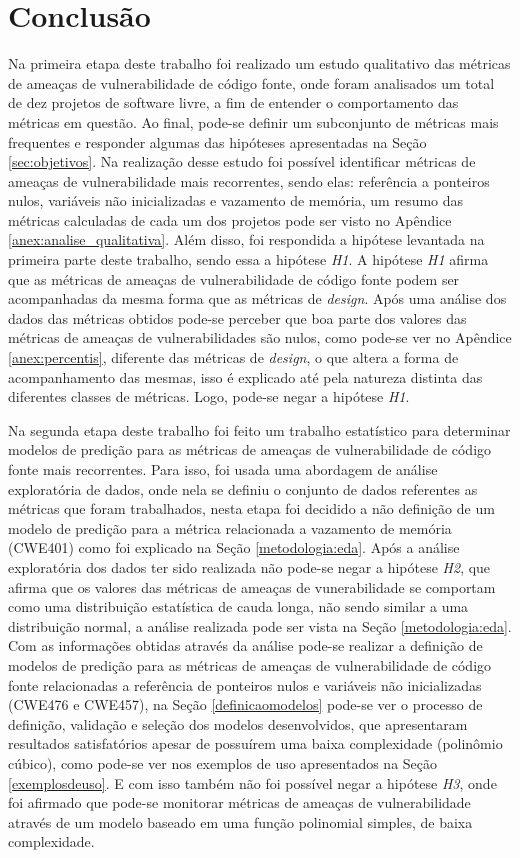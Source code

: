 \chapter{Conclusão} \label{chap:conclusao}

Na primeira etapa deste trabalho foi realizado um estudo qualitativo das
métricas de ameaças de vulnerabilidade de código fonte, onde foram analisados um
total de dez projetos de software livre, a fim de entender o comportamento das
métricas em questão. Ao final, pode-se definir um subconjunto de métricas mais
frequentes e responder algumas das hipóteses apresentadas na Seção
\ref{sec:objetivos}. Na realização desse estudo foi possível identificar
métricas de ameaças de vulnerabilidade mais recorrentes, sendo elas: referência
a ponteiros nulos, variáveis não inicializadas e vazamento de memória, um resumo
das métricas calculadas de cada um dos projetos pode ser visto no Apêndice
\ref{anex:analise_qualitativa}. Além disso, foi respondida a hipótese levantada
na primeira parte deste trabalho, sendo essa a hipótese \textit{H1}. A hipótese
\textit{H1} afirma que as métricas de ameaças de vulnerabilidade de código fonte
podem ser acompanhadas da mesma forma que as métricas de \textit{design}.
Após uma análise dos dados das métricas obtidos pode-se perceber que boa parte
dos valores das métricas de ameaças de vulnerabilidades são nulos, como pode-se
ver no Apêndice \ref{anex:percentis}, diferente das métricas de \textit{design},
o que altera a forma de acompanhamento das mesmas, isso é explicado até pela
natureza distinta das diferentes classes de métricas. Logo, pode-se negar a
hipótese \textit{H1}.

Na segunda etapa deste trabalho foi feito um trabalho estatístico para
determinar modelos de predição para as métricas de ameaças de vulnerabilidade de
código fonte mais recorrentes. Para isso, foi usada uma abordagem de análise
exploratória de dados, onde nela se definiu o conjunto de dados referentes as
métricas que foram trabalhados, nesta etapa foi decidido a não definição de um
modelo de predição para a métrica relacionada a vazamento de memória (CWE401)
como foi explicado na Seção \ref{metodologia:eda}. Após a análise exploratória
dos dados ter sido realizada não pode-se negar a hipótese \textit{H2}, que
afirma que os valores das métricas de ameaças de vunerabilidade se comportam
como uma distribuição estatística de cauda longa, não sendo similar a uma
distribuição normal, a análise realizada pode ser vista na Seção
\ref{metodologia:eda}. Com as informações obtidas através da análise pode-se
realizar a definição de modelos de predição para as métricas de ameaças de
vulnerabilidade de código fonte relacionadas a referência de ponteiros nulos e
variáveis não inicializadas (CWE476 e CWE457), na Seção \ref{definicaomodelos}
pode-se ver o processo de definição, validação e seleção dos modelos
desenvolvidos, que apresentaram resultados satisfatórios apesar de possuírem uma
baixa complexidade (polinômio cúbico), como pode-se ver nos exemplos de uso
apresentados na Seção \ref{exemplosdeuso}. E com isso também não foi possível
negar a hipótese \textit{H3}, onde foi afirmado que pode-se monitorar métricas
de ameaças de vulnerabilidade através de um modelo baseado em uma função
polinomial simples, de baixa complexidade.

